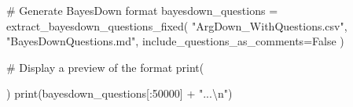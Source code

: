\documentclass[
  11pt,
  letterpaper,
]{book}
\newenvironment{Shaded}{\begin{snugshade}}{\end{snugshade}}
\newcommand{\BuiltInTok}[1]{\textcolor[rgb]{0.00,0.23,0.31}{#1}}
\newcommand{\CharTok}[1]{\textcolor[rgb]{0.13,0.47,0.30}{#1}}
\newcommand{\CommentTok}[1]{\textcolor[rgb]{0.37,0.37,0.37}{#1}}
\newcommand{\DecValTok}[1]{\textcolor[rgb]{0.68,0.00,0.00}{#1}}
\newcommand{\NormalTok}[1]{\textcolor[rgb]{0.00,0.23,0.31}{#1}}
\newcommand{\OperatorTok}[1]{\textcolor[rgb]{0.37,0.37,0.37}{#1}}
\newcommand{\StringTok}[1]{\textcolor[rgb]{0.13,0.47,0.30}{#1}}
\newcommand{\VariableTok}[1]{\textcolor[rgb]{0.07,0.07,0.07}{#1}}
\begin{document}
\begin{Shaded}
\begin{Highlighting}[]
\CommentTok{\# Generate BayesDown format}
\NormalTok{bayesdown\_questions }\OperatorTok{=}\NormalTok{ extract\_bayesdown\_questions\_fixed(}
    \StringTok{"ArgDown\_WithQuestions.csv"}\NormalTok{,}
    \StringTok{"BayesDownQuestions.md"}\NormalTok{,}
\NormalTok{    include\_questions\_as\_comments}\OperatorTok{=}\VariableTok{False}
\NormalTok{)}

\CommentTok{\# Display a preview of the format}
\BuiltInTok{print}\NormalTok{(}

\NormalTok{)}
\BuiltInTok{print}\NormalTok{(bayesdown\_questions[:}\DecValTok{50000}\NormalTok{] }\OperatorTok{+} \StringTok{"...}\CharTok{\textbackslash{}n}\StringTok{"}\NormalTok{)}
\end{Highlighting}
\end{Shaded}
\end{document}
